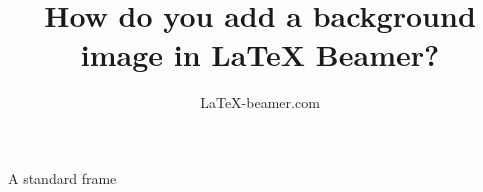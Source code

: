 \documentclass{beamer}
\title{How do you add a background image in LaTeX Beamer?}
\author{\LaTeX{}-beamer.com}
\begin{document}
\maketitle

\begin{frame}{A standard frame}

\end{frame}
\end{document}
